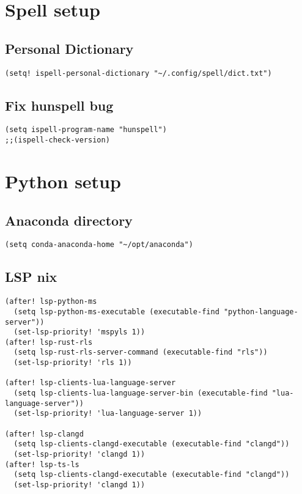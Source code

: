 \documentclass{assignments}
\begin{document}
\section*{Spell setup}
\label{sec:org1a92216}
\subsection*{Personal Dictionary}
\label{sec:orgb8369a4}
\begin{verbatim}
(setq! ispell-personal-dictionary "~/.config/spell/dict.txt")
\end{verbatim}
\subsection*{Fix hunspell bug}
\label{sec:org9bb128b}
\begin{verbatim}
(setq ispell-program-name "hunspell")
;;(ispell-check-version)
\end{verbatim}

\section*{Python setup}
\label{sec:orgb7d5038}

\subsection*{Anaconda directory}
\label{sec:org87491ff}
\begin{verbatim}
(setq conda-anaconda-home "~/opt/anaconda")
\end{verbatim}
\subsection*{LSP nix}
\label{sec:orgd315d0d}
\begin{verbatim}
(after! lsp-python-ms
  (setq lsp-python-ms-executable (executable-find "python-language-server"))
  (set-lsp-priority! 'mspyls 1))
(after! lsp-rust-rls
  (setq lsp-rust-rls-server-command (executable-find "rls"))
  (set-lsp-priority! 'rls 1))

(after! lsp-clients-lua-language-server
  (setq lsp-clients-lua-language-server-bin (executable-find "lua-language-server"))
  (set-lsp-priority! 'lua-language-server 1))

(after! lsp-clangd
  (setq lsp-clients-clangd-executable (executable-find "clangd"))
  (set-lsp-priority! 'clangd 1))
(after! lsp-ts-ls
  (setq lsp-clients-clangd-executable (executable-find "clangd"))
  (set-lsp-priority! 'clangd 1))
\end{verbatim}
\end{document}
